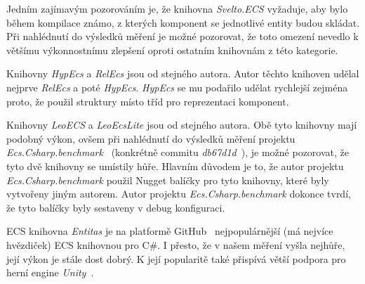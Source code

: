 Jedním zajímavým pozorováním je, že knihovna \textit{Svelto.ECS} vyžaduje, aby bylo během kompilace známo, z kterých komponent se jednotlivé entity budou skládat. Při nahlédnutí do výsledků měření je možné pozorovat, že toto omezení nevedlo k většímu výkonnostnímu zlepšení oproti ostatním knihovnám z této kategorie.

Knihovny \textit{HypEcs} a \textit{RelEcs} jsou od stejného autora. Autor těchto knihoven udělal nejprve \textit{RelEcs} a poté \textit{HypEcs}. \textit{HypEcs} se mu podařilo udělat rychlejší zejména proto, že použil struktury místo tříd pro reprezentaci komponent.

Knihovny \textit{LeoECS} a \textit{LeoEcsLite} jsou od stejného autora. Obě tyto knihovny mají podobný výkon, ovšem při nahlédnutí do výsledků měření projektu \textit{Ecs.Csharp.benchmark}~\cite{EcsCsharpBenchmark} (konkrétně commitu \textit{db67d1d}~\cite{EcsCsharpBenchmarkCommit}), je možné pozorovat, že tyto dvě knihovny se umístily hůře. Hlavním důvodem je to, že autor projektu \textit{Ecs.Csharp.benchmark} použil Nugget balíčky pro tyto knihovny, které byly vytvořeny jiným autorem. Autor projektu \textit{Ecs.Csharp.benchmark} dokonce tvrdí, že tyto balíčky byly sestaveny v debug konfiguraci.

ECS knihovna \textit{Entitas} je na platformě GitHub~\cite{GitHub} nejpopulárnější (má nejvíce hvězdiček) ECS knihovnou pro C\#. I přesto, že v našem měření vyšla nejhůře, její výkon je stále dost dobrý. K její popularitě také přispívá větší podpora pro herní engine \textit{Unity}~\cite{Unity}.